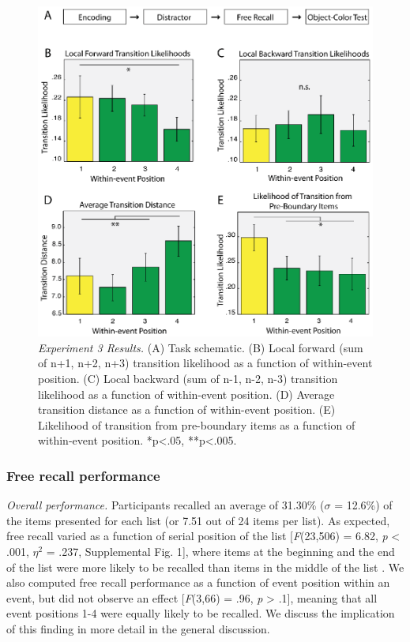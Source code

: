 \begin{figure}
  \centering
  \includegraphics[width=\textwidth]{figures/chapter1_figure4.eps}
  \caption[Behavioral Experiment 3 Results]{\textit{Experiment 3 Results.} (A) Task schematic. (B) Local forward (sum of n+1, n+2, n+3) transition likelihood as a function of within-event position. (C) Local backward (sum of n-1, n-2, n-3) transition likelihood as a function of within-event position. (D) Average transition distance as a function of within-event position.  (E) Likelihood of transition from pre-boundary items as a function of within-event position.  *p<.05, **p<.005.}
  \label{chapter1_figure4}
\end{figure}

\subsubsection{Free recall performance}\label{free-recall-performance}

\emph{Overall performance.} Participants recalled an average of 31.30\%
(\(\sigma\) = 12.6\%) of the items presented for each list (or 7.51 out
of 24 items per list). As expected, free recall varied as a function of
serial position of the list {[}\emph{F}(23,506) = 6.82, \emph{p}
\textless{} .001, \(\eta^{2}\) = .237, Supplemental Fig. 1{]}, where
items at the beginning and the end of the list were more likely to be
recalled than items in the middle of the list
\autocite{murdock_serial_1962}. We also computed free recall performance
as a function of event position within an event, but did not observe an
effect {[}\emph{F}(3,66) = .96, \emph{p} \textgreater{} .1{]}, meaning
that all event positions 1-4 were equally likely to be recalled. We
discuss the implication of this finding in more detail in the general
discussion.

